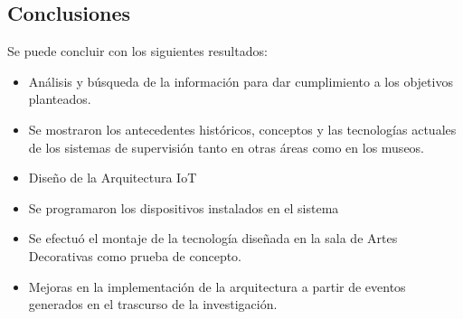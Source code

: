 \begin{center}
    \section*{\LARGE Conclusiones}
\end{center}

Se puede concluir con los siguientes resultados:
\begin{itemize}
    \item Análisis y búsqueda de la información para dar cumplimiento a los objetivos planteados.
    \item Se mostraron los antecedentes históricos, conceptos y las tecnologías actuales de los sistemas de supervisión tanto en otras áreas como en los museos.
    \item Diseño de la Arquitectura IoT
    \item Se programaron los dispositivos instalados en el sistema
    \item Se efectuó el montaje de la tecnología diseñada en la sala de Artes Decorativas como prueba de concepto.
    \item Mejoras en la implementación de la arquitectura a partir de eventos generados en el trascurso de la investigación.
\end{itemize}